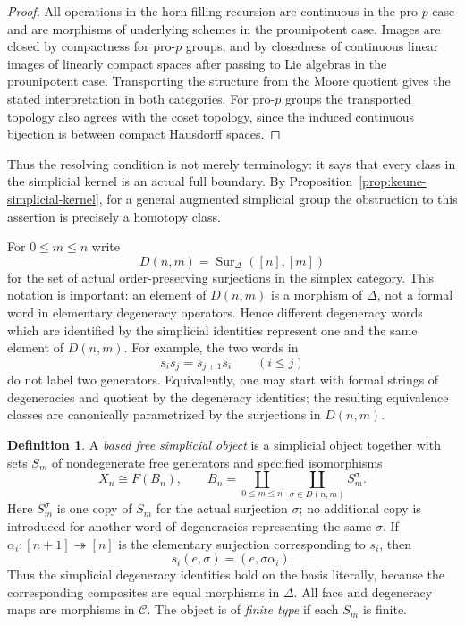 \documentclass[11pt,a4paper]{article}
\theoremstyle{definition}
\newtheorem{definition}[theorem]{Definition}
\newcommand{\C}{\mathcal C}
\begin{document}
\begin{proof}
All operations in the horn-filling recursion are continuous in the
pro-$p$ case and are morphisms of underlying schemes in the
prounipotent case. Images are closed by compactness for pro-$p$
groups, and by closedness of continuous linear images of linearly
compact spaces after passing to Lie algebras in the prounipotent
case. Transporting the structure from the Moore quotient gives the
stated interpretation in both categories. For pro-$p$ groups the
transported topology also agrees with the coset topology, since the
induced continuous bijection is between compact Hausdorff spaces.
\end{proof}

Thus the resolving condition is not merely terminology: it says that
every class in the simplicial kernel is an actual full boundary. By
Proposition~\ref{prop:keune-simplicial-kernel}, for a general augmented
simplicial group the obstruction to this assertion is precisely a
homotopy class.

For $0\leq m\leq n$ write
\[
 D(n,m)=\operatorname{Sur}_{\Delta}([n],[m])
\]
for the set of actual order-preserving surjections in the simplex
category. This notation is important: an element of $D(n,m)$ is a
morphism of $\Delta$, not a formal word in elementary degeneracy
operators. Hence different degeneracy words which are identified by the
simplicial identities represent one and the same element of $D(n,m)$.
For example, the two words in
\[
 s_i s_j=s_{j+1}s_i\qquad(i\leq j)
\]
do not label two generators. Equivalently, one may start with formal
strings of degeneracies and quotient by the degeneracy identities; the
resulting equivalence classes are canonically parametrized by the
surjections in $D(n,m)$.

\begin{definition}\label{def:free}
A \emph{based free simplicial object} is a simplicial object together
with sets $S_m$ of nondegenerate free generators and specified
isomorphisms
\begin{equation}\label{eq:basis}
 X_n\cong F(B_n),\qquad
 B_n=\coprod_{0\leq m\leq n}\ \coprod_{\sigma\in D(n,m)}S_m^{\sigma}.
\end{equation}
Here $S_m^{\sigma}$ is one copy of $S_m$ for the actual surjection
$\sigma$; no additional copy is introduced for another word of
degeneracies representing the same $\sigma$. If
$\alpha_i:[n+1]\twoheadrightarrow[n]$ is the elementary surjection
corresponding to $s_i$, then
\[
 s_i(e,\sigma)=(e,\sigma\alpha_i).
\]
Thus the simplicial degeneracy identities hold on the basis literally,
because the corresponding composites are equal morphisms in $\Delta$.
All face and degeneracy maps are morphisms in $\C$. The object is of
\emph{finite type} if each $S_m$ is finite.
\end{definition}
\end{document}

